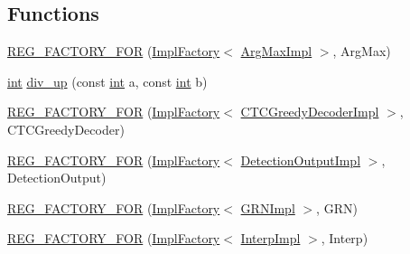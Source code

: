 \subsection*{Functions}
\begin{DoxyCompactItemize}
\item 
\hyperlink{namespaceInferenceEngine_1_1Extensions_1_1Cpu_a6ab1bab206e680f5ff1eae23779a9e87}{R\+E\+G\+\_\+\+F\+A\+C\+T\+O\+R\+Y\+\_\+\+F\+OR} (\hyperlink{classInferenceEngine_1_1Extensions_1_1Cpu_1_1ImplFactory}{Impl\+Factory}$<$ \hyperlink{classInferenceEngine_1_1Extensions_1_1Cpu_1_1ArgMaxImpl}{Arg\+Max\+Impl} $>$, Arg\+Max)
\item 
\hyperlink{CMakeCache_8txt_a79a3d8790b2588b09777910863574e09}{int} \hyperlink{namespaceInferenceEngine_1_1Extensions_1_1Cpu_a979bf0275746a13e636116a432953b15}{div\+\_\+up} (const \hyperlink{CMakeCache_8txt_a79a3d8790b2588b09777910863574e09}{int} a, const \hyperlink{CMakeCache_8txt_a79a3d8790b2588b09777910863574e09}{int} b)
\item 
\hyperlink{namespaceInferenceEngine_1_1Extensions_1_1Cpu_ae714ccbd77d97284b2d9c8c8334836cb}{R\+E\+G\+\_\+\+F\+A\+C\+T\+O\+R\+Y\+\_\+\+F\+OR} (\hyperlink{classInferenceEngine_1_1Extensions_1_1Cpu_1_1ImplFactory}{Impl\+Factory}$<$ \hyperlink{classInferenceEngine_1_1Extensions_1_1Cpu_1_1CTCGreedyDecoderImpl}{C\+T\+C\+Greedy\+Decoder\+Impl} $>$, C\+T\+C\+Greedy\+Decoder)
\item 
\hyperlink{namespaceInferenceEngine_1_1Extensions_1_1Cpu_a17017d6ca67378686c5605d7ba799580}{R\+E\+G\+\_\+\+F\+A\+C\+T\+O\+R\+Y\+\_\+\+F\+OR} (\hyperlink{classInferenceEngine_1_1Extensions_1_1Cpu_1_1ImplFactory}{Impl\+Factory}$<$ \hyperlink{classInferenceEngine_1_1Extensions_1_1Cpu_1_1DetectionOutputImpl}{Detection\+Output\+Impl} $>$, Detection\+Output)
\item 
\hyperlink{namespaceInferenceEngine_1_1Extensions_1_1Cpu_a1ace3877be716e482474baa4993f0db3}{R\+E\+G\+\_\+\+F\+A\+C\+T\+O\+R\+Y\+\_\+\+F\+OR} (\hyperlink{classInferenceEngine_1_1Extensions_1_1Cpu_1_1ImplFactory}{Impl\+Factory}$<$ \hyperlink{classInferenceEngine_1_1Extensions_1_1Cpu_1_1GRNImpl}{G\+R\+N\+Impl} $>$, G\+RN)
\item 
\hyperlink{namespaceInferenceEngine_1_1Extensions_1_1Cpu_a8ccf6c345067fece7fc287b9eb5a160d}{R\+E\+G\+\_\+\+F\+A\+C\+T\+O\+R\+Y\+\_\+\+F\+OR} (\hyperlink{classInferenceEngine_1_1Extensions_1_1Cpu_1_1ImplFactory}{Impl\+Factory}$<$ \hyperlink{classInferenceEngine_1_1Extensions_1_1Cpu_1_1InterpImpl}{Interp\+Impl} $>$, Interp)
\item 

\end{DoxyCompactItemize}
